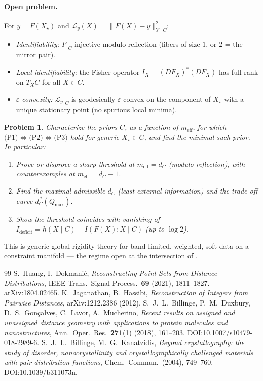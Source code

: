 \documentclass[11pt]{article}
\newtheorem{problem}{Problem}
\begin{document}
\paragraph{Open problem.}
For $y=F(X_\star)$ and $\mathcal{L}_y(X)=\|F(X)-y\|_Y^2|_C$:
\begin{itemize}
\item[\textbf{(P1)}] \emph{Identifiability:} $F|_C$ injective modulo
reflection (fibers of size $1$, or $2$ = the mirror pair).
\item[\textbf{(P2)}] \emph{Local identifiability:} the Fisher operator
$I_X=(DF_X)^{*}(DF_X)$ has full rank on $T_XC$ for all $X\in C$.
\item[\textbf{(P3)}] \emph{$\varepsilon$-convexity:} $\mathcal{L}_y|_C$ is
geodesically $\varepsilon$-convex on the component of $X_\star$ with a unique
stationary point (no spurious local minima).
\end{itemize}

\begin{problem}
Characterize the priors $C$, as a function of $m_{\mathrm{eff}}$, for which
$\text{(P1)}\!\Leftrightarrow\!\text{(P2)}\!\Leftrightarrow\!\text{(P3)}$
hold for generic $X_\star\in C$, and find the \emph{minimal} such prior. In
particular:
\begin{enumerate}
\item[\textbf{(a)}] Prove or disprove a sharp threshold at
$m_{\mathrm{eff}}=d_C$ (modulo reflection), with counterexamples at
$m_{\mathrm{eff}}=d_C-1$.
\item[\textbf{(b)}] Find the maximal admissible $d_C$ (least external
information) and the trade-off curve $d_C^{\,*}(Q_{\max})$.
\item[\textbf{(c)}] Show the threshold coincides with vanishing of
$I_{\mathrm{deficit}}=h(X\mid C)-I(F(X);X\mid C)$ (up to $\log 2$).
\end{enumerate}
\end{problem}

This is generic-global-rigidity theory for band-limited, weighted, soft data
on a constraint manifold --- the regime open at the intersection of
\cite{HuangDokmanic2021,JaganathanHassibi2012,Billinge2018}.

\begin{thebibliography}{99}
 S.~Huang, I.~Dokmani\'c, \emph{Reconstructing
Point Sets from Distance Distributions}, IEEE Trans.\ Signal Process.\
\textbf{69} (2021), 1811--1827. arXiv:1804.02465.
 K.~Jaganathan, B.~Hassibi, \emph{Reconstruction
of Integers from Pairwise Distances}, arXiv:1212.2386 (2012).
 S.~J.~L.~Billinge, P.~M.~Duxbury, D.~S.~Gon\c{c}alves,
C.~Lavor, A.~Mucherino, \emph{Recent results on assigned and unassigned
distance geometry with applications to protein molecules and nanostructures},
Ann.\ Oper.\ Res.\ \textbf{271}(1) (2018), 161--203. DOI:10.1007/s10479-018-2989-6.
\bibitem{Billinge2004} S.~J.~L.~Billinge, M.~G.~Kanatzidis, \emph{Beyond
crystallography: the study of disorder, nanocrystallinity and
crystallographically challenged materials with pair distribution functions},
Chem.\ Commun.\ (2004), 749--760. DOI:10.1039/b311073n.
\end{thebibliography}
\end{document}
